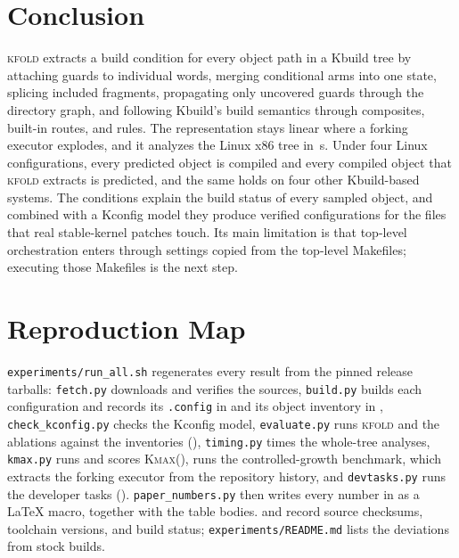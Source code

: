 \documentclass[acmsmall,screen,review]{acmart}
\newcommand{\tool}{\textsc{kfold}\xspace}
\newcommand{\kmax}{\textsc{Kmax}\xspace}
\begin{document}
\section{Conclusion}
\label{sec:conclusion}

\tool extracts a build condition for every object path in a Kbuild tree by attaching guards to individual words, merging conditional arms into one state, splicing included fragments, propagating only uncovered guards through the directory graph, and following Kbuild's build semantics through composites, built-in routes, and rules. The representation stays linear where a forking executor explodes, and it analyzes the Linux \NLinuxVersion x86 tree in \NLinuxSeconds\,s. Under four Linux configurations, every predicted object is compiled and every compiled object that \tool extracts is predicted, and the same holds on four other Kbuild-based systems. The conditions explain the build status of every sampled object, and combined with a Kconfig model they produce verified configurations for the files that real stable-kernel patches touch. Its main limitation is that top-level orchestration enters through settings copied from the top-level Makefiles; executing those Makefiles is the next step.




\appendix
\section{Reproduction Map}
\label{app:reproduction}

\texttt{experiments/run\_all.sh} regenerates every result from the pinned release tarballs: \texttt{fetch.py} downloads and verifies the sources, \texttt{build.py} builds each configuration and records its \texttt{.config} in  and its object inventory in , \texttt{check\_kconfig.py} checks the Kconfig model, \texttt{evaluate.py} runs \tool and the ablations against the inventories (), \texttt{timing.py} times the whole-tree analyses, \texttt{kmax.py} runs and scores \kmax (),  runs the controlled-growth benchmark, which extracts the forking executor from the repository history, and \texttt{devtasks.py} runs the developer tasks (). \texttt{paper\_numbers.py} then writes every number in  as a \LaTeX{} macro, together with the table bodies.  and  record source checksums, toolchain versions, and build status; \texttt{experiments/README.md} lists the deviations from stock builds.
\end{document}

